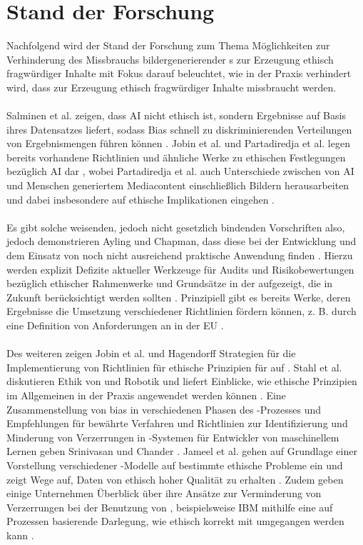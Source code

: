 \chapter{Stand der Forschung}

Nachfolgend wird der Stand der Forschung zum Thema Möglichkeiten zur Verhinderung des Missbrauchs bildergenerierender s zur Erzeugung ethisch fragwürdiger Inhalte mit Fokus darauf beleuchtet, wie in der Praxis verhindert wird, dass  zur Erzeugung ethisch fragwürdiger Inhalte missbraucht werden.
\\\\
Salminen et al. zeigen, dass AI nicht ethisch ist, sondern Ergebnisse auf Basis ihres Datensatzes liefert, sodass Bias schnell zu diskriminierenden Verteilungen von Ergebnismengen führen können \cite{Salminen}. Jobin et al. und  Partadiredja et al. legen bereits vorhandene Richtlinien und ähnliche Werke zu ethischen Festlegungen bezüglich AI dar \cite{Jobin} \cite{Partadiredja}, wobei Partadiredja et al. auch Unterschiede zwischen von AI und Menschen generiertem Mediacontent einschließlich Bildern herausarbeiten und dabei insbesondere auf ethische Implikationen eingehen \cite{Partadiredja}.
\\\\
Es gibt solche weisenden, jedoch nicht gesetzlich bindenden Vorschriften also, jedoch demonstrieren Ayling und Chapman, dass diese bei der Entwicklung und dem Einsatz von  noch nicht ausreichend praktische Anwendung finden \cite{Ayling}. Hierzu werden explizit Defizite aktueller Werkzeuge für Audits und Risikobewertungen bezüglich ethischer Rahmenwerke und Grundsätze in der  aufgezeigt, die in Zukunft berücksichtigt werden sollten \cite{Ayling}. Prinzipiell gibt es bereits Werke, deren Ergebnisse die Umsetzung verschiedener Richtlinien fördern können, z. B. durch eine Definition von Anforderungen an  in der EU \cite{EUCommision}. 
\\\\
Des weiteren zeigen Jobin et al. und Hagendorff Strategien für die Implementierung von Richtlinien für ethische Prinzipien für  auf \cite{Jobin} \cite{Hagendorff}. Stahl et al. diskutieren Ethik von  und Robotik und liefert Einblicke, wie ethische Prinzipien im Allgemeinen in der Praxis angewendet werden können \cite{Stahl}. Eine Zusammenstellung von \Gls{bias} in verschiedenen Phasen des -Prozesses und Empfehlungen für bewährte Verfahren und Richtlinien zur Identifizierung und Minderung von Verzerrungen in -Systemen für Entwickler von maschinellem Lernen geben Srinivasan und Chander \cite{Srinivasan}. Jameel et al. gehen auf Grundlage einer Vorstellung verschiedener -Modelle auf bestimmte ethische Probleme ein und zeigt Wege auf, Daten von ethisch hoher Qualität zu erhalten \cite{Jameel}. Zudem geben einige Unternehmen Überblick über ihre Ansätze zur Verminderung von Verzerrungen bei der Benutzung von , beispielsweise IBM mithilfe eine auf Prozessen basierende Darlegung, wie ethisch korrekt mit  umgegangen werden kann \cite{Hobson}.
